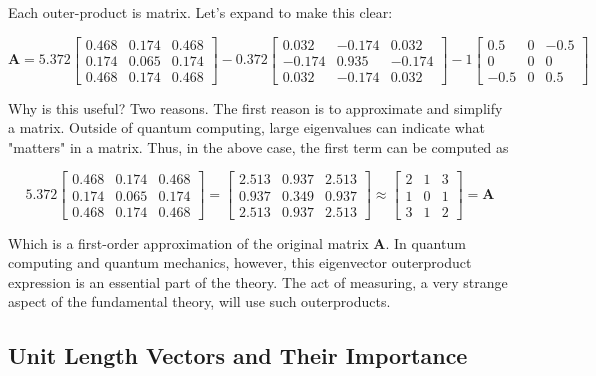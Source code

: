 \documentclass[main.tex]{subfiles}
\begin{document}
Each outer-product is matrix. Let's expand to make this clear:

$$
\mathbf{A}=5.372\left[\begin{array}{ccc}
0.468 & 0.174 & 0.468 \\
0.174 & 0.065 & 0.174 \\
0.468 & 0.174 & 0.468
\end{array}\right]-0.372\left[\begin{array}{ccc}
0.032 & -0.174 & 0.032 \\
-0.174 & 0.935 & -0.174 \\
0.032 & -0.174 & 0.032
\end{array}\right]-1\left[\begin{array}{ccc}
0.5 & 0 & -0.5 \\
0 & 0 & 0 \\
-0.5 & 0 & 0.5
\end{array}\right]
$$

Why is this useful? Two reasons. The first reason is to approximate and simplify a matrix. Outside of quantum computing, large eigenvalues can indicate what "matters" in a matrix. Thus, in the above case, the first term can be computed as

$$
5.372\left[\begin{array}{lll}
0.468 & 0.174 & 0.468 \\
0.174 & 0.065 & 0.174 \\
0.468 & 0.174 & 0.468
\end{array}\right]=\left[\begin{array}{lll}
2.513 & 0.937 & 2.513 \\
0.937 & 0.349 & 0.937 \\
2.513 & 0.937 & 2.513
\end{array}\right] \approx\left[\begin{array}{lll}
2 & 1 & 3 \\
1 & 0 & 1 \\
3 & 1 & 2
\end{array}\right]=\mathbf{A}
$$

Which is a first-order approximation of the original matrix $\mathbf{A}$. In quantum computing and quantum mechanics, however, this eigenvector outerproduct expression is an essential part of the theory. The act of measuring, a very strange aspect of the fundamental theory, will use such outerproducts.

\subsection{Unit Length Vectors and Their Importance}
\end{document}
